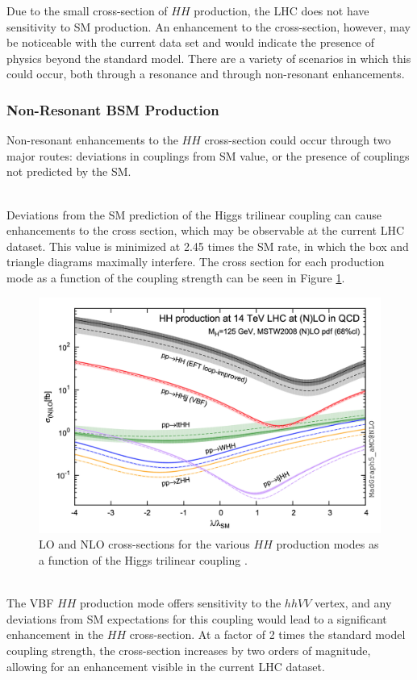 Due to the small cross-section of $HH$ production, the LHC does not have sensitivity to \gls{SM} production. An enhancement to the cross-section, however, may be noticeable with the current data set and would indicate the presence of physics beyond the standard model. There are a variety of scenarios in which this could occur, both through a resonance and through non-resonant enhancements.

\subsubsection{Non-Resonant BSM Production}

Non-resonant enhancements to the $HH$ cross-section could occur through two major routes: deviations in couplings from \gls{SM} value, or the presence of couplings not predicted by the \gls{SM}.

\noindent{${\boldsymbol \kappa_{\lambda}}$}\\
\indent Deviations from the \gls{SM} prediction of the Higgs trilinear coupling can cause enhancements to the cross section, which may be observable at the current \gls{LHC} dataset. This value is minimized at 2.45 times the \gls{SM} rate, in which the box and triangle diagrams maximally interfere. The cross section for each production mode as a function of the coupling strength can be seen in Figure \ref{fig:klambda-xsec}.

\begin{figure}[!ht]
    \centering
    \includegraphics[width=.7\textwidth]{chapters/chapter1_theory/images/klambda-xsec.png}
    \caption{LO and NLO cross-sections for the various $HH$ production modes as a function of the Higgs trilinear coupling \cite{klambda-xsec}.}
    \label{fig:klambda-xsec}
\end{figure}

\\
\indent The \gls{VBF} $HH$ production mode offers sensitivity to the $hhVV$ vertex, and any deviations from \gls{SM} expectations for this coupling would lead to a significant enhancement in the $HH$ cross-section. At a factor of 2 times the standard model coupling strength, the cross-section increases by two orders of magnitude, allowing for an enhancement visible in the current \gls{LHC} dataset.


